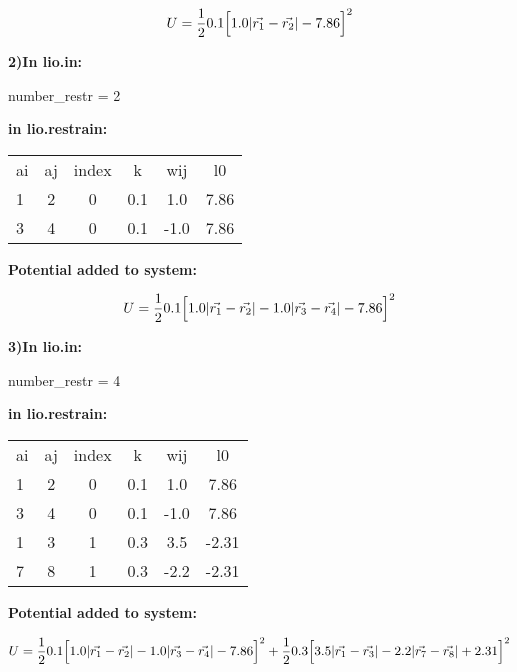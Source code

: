 \documentclass[journal=jctcce,manuscript=article]{achemso}
\begin{document}
    \begin{equation}
      U=\frac{1}{2} 0.1 \Big{[} 1.0 |\vec{r_1} - \vec{r_2}| - 7.86\Big{]}^2  
      \label{Ex1}
    \end{equation}


    \textbf{2)In lio.in:}

    number\_restr = 2

    \textbf{in lio.restrain:}

    \begin{table}  [H]
      \begin{center}
      \begin{tabular}{ l c c c c c}
         ai & aj & index &   k  &    wij   &  l0    \\
         1  &  2 &   0   &  0.1 &    1.0   & 7.86   \\
         3  &  4 &   0   &  0.1 &   -1.0   & 7.86   \\
       \end{tabular}
       \end{center}
      \label{Tex2}
    \end{table}

    \textbf{Potential added to system:}

    \begin{equation}
      U=\frac{1}{2} 0.1 \Big{[} 1.0 |\vec{r_1} - \vec{r_2}| - 1.0 |\vec{r_3} - \vec{r_4}| - 7.86\Big{]}^2  
      \label{Ex2}
    \end{equation}


    \textbf{3)In lio.in:}

    number\_restr = 4

    \textbf{in lio.restrain:}

    \begin{table}  [H]
      \begin{center}
      \begin{tabular}{ l c c c c c}
         ai & aj & index &   k  &    wij   &  l0    \\
         1  &  2 &   0   &  0.1 &    1.0   & 7.86   \\
         3  &  4 &   0   &  0.1 &   -1.0   & 7.86   \\
         1  &  3 &   1   &  0.3 &    3.5   & -2.31   \\
         7  &  8 &   1   &  0.3 &   -2.2   & -2.31   \\
       \end{tabular}
       \end{center}
      \label{Tex3}
    \end{table}

    \textbf{Potential added to system:}

    \begin{equation}
      U=\frac{1}{2} 0.1 \Big{[} 1.0 |\vec{r_1} - \vec{r_2}| - 1.0 |\vec{r_3} - \vec{r_4}| - 7.86\Big{]}^2 + \frac{1}{2} 0.3 \Big{[} 3.5 |\vec{r_1} - \vec{r_3}| - 2.2 |\vec{r_7} - \vec{r_8}| +2.31\Big{]}^2 
      \label{Ex3}
    \end{equation}
\end{document}
